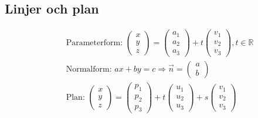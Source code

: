 \begin{multicols}{2}
\section{Linjer och plan}
\begin{align*} 
  &\quad  \text{Parameterform: }
  \begin{pmatrix} x \\ y \\ z \end{pmatrix} =
  \begin{pmatrix} a_1 \\ a_2 \\ a_3 \end{pmatrix} +
  t\begin{pmatrix} v_1 \\ v_2 \\ v_3 \end{pmatrix}, t \in\mathbb{R} \\
  &\quad  \text{Normalform: } ax+by=c \Rightarrow
  \vec{n} = \begin{pmatrix} a \\ b \end{pmatrix} \\
  &\quad  \text{Plan: }
  \begin{pmatrix} x \\ y \\ z \end{pmatrix} =
  \begin{pmatrix} p_1 \\ p_2 \\ p_3 \end{pmatrix} +
  t\begin{pmatrix} u_1 \\ u_2 \\ u_3 \end{pmatrix} +
  s\begin{pmatrix} v_1 \\ v_2 \\ v_3 \end{pmatrix} \\
\end{align*}



\end{multicols}
